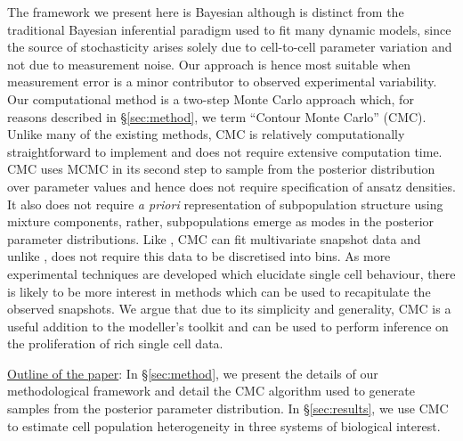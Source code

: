 The framework we present here is Bayesian although is distinct from the traditional Bayesian inferential paradigm used to fit many dynamic models, since the source of stochasticity arises solely due to cell-to-cell parameter variation and not due to measurement noise. Our approach is hence most suitable when measurement error is a minor contributor to observed experimental variability. Our computational method is a two-step Monte Carlo approach which, for reasons described in \S \ref{sec:method}, we term ``Contour Monte Carlo'' (CMC). Unlike many of the existing methods, CMC is relatively computationally straightforward to implement and does not require extensive computation time. CMC uses MCMC in its second step to sample from the posterior distribution over parameter values and hence does not require specification of ansatz densities. It also does not require \textit{a priori} representation of subpopulation structure using mixture components, rather, subpopulations emerge as modes in the posterior parameter distributions. Like \cite{loos2018hierarchical}, CMC can fit multivariate snapshot data and unlike \cite{dixit2018maximum}, does not require this data to be discretised into bins. As more experimental techniques are developed which elucidate single cell behaviour, there is likely to be more interest in methods which can be used to recapitulate the observed snapshots. We argue that due to its simplicity and generality, CMC is a useful addition to the modeller's toolkit and can be used to perform inference on the proliferation of rich single cell data.


\underline{Outline of the paper}: In \S \ref{sec:method}, we present the details of our methodological framework and detail the CMC algorithm used to generate samples from the posterior parameter distribution. In \S \ref{sec:results}, we use CMC to estimate cell population heterogeneity in three systems of biological interest.


